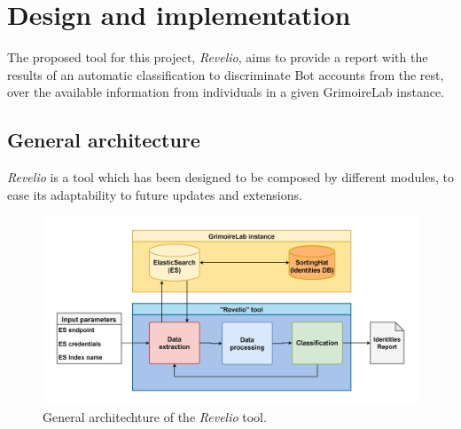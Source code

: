 \documentclass[a4paper, 12pt]{book}
\begin{document}


\cleardoublepage


\chapter{Design and implementation}
\label{chap:design-implementation}

The proposed tool for this project, \emph{Revelio}, aims to provide a report with the results of an automatic classification to discriminate Bot accounts from the rest, over the available information from individuals in a given GrimoireLab instance.


\section{General architecture} 
\label{sec:architecture}

\emph{Revelio} is a tool which has been designed to be composed by different modules, to ease its adaptability to future updates and extensions.

\begin{figure}
  \centering
  \includegraphics[width=17cm, keepaspectratio]{img/general-architecture-revelio.png}
  \caption{General architechture of the \emph{Revelio} tool.}
  \label{fig:general-arch-revelio}
\end{figure}
\end{document}

